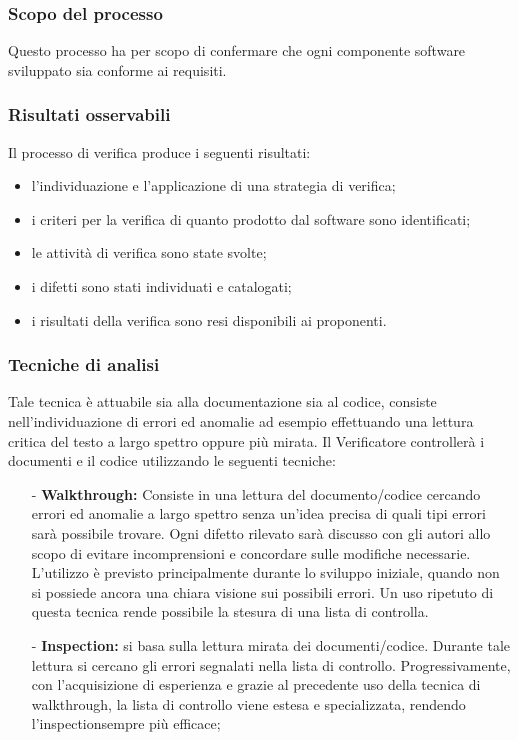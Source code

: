 \documentclass[a4paper,11pt]{article}
\begin{document}
				\subsubsection{Scopo del processo}
					Questo processo ha per scopo di confermare che ogni componente software sviluppato sia conforme ai requisiti.		
				\subsubsection{Risultati osservabili}
				Il processo di verifica produce i seguenti risultati:
				\begin{itemize}
					\item l'individuazione e l'applicazione di una strategia di verifica;
					\item i criteri per la verifica di quanto prodotto dal software sono identificati;
					\item le attività di verifica sono state svolte;
					\item i difetti sono stati individuati e catalogati;
					\item i risultati della verifica sono resi disponibili ai proponenti.
				\end{itemize}
				
				\subsubsection{Tecniche di analisi}
				Tale tecnica è attuabile sia alla documentazione sia al codice, consiste nell'individuazione di errori ed anomalie ad esempio effettuando una lettura critica del testo a largo spettro oppure più mirata. Il Verificatore controllerà i documenti e il codice utilizzando le seguenti tecniche:
				\begin{itemize}
				\item[-]\textbf{Walkthrough\addglos:} Consiste in una lettura del documento/codice cercando errori ed anomalie a largo spettro senza un’idea precisa di quali tipi errori sarà possibile trovare. Ogni difetto rilevato sarà discusso con gli autori allo scopo di evitare incomprensioni e concordare sulle modifiche necessarie. L'utilizzo è previsto principalmente durante lo sviluppo iniziale, quando non si possiede ancora una chiara visione sui possibili errori. Un uso ripetuto di questa tecnica rende possibile la stesura di una lista di controlla. 		
				
				\item[-]\textbf{Inspection\addglos:} si basa sulla lettura mirata dei documenti/codice. Durante tale lettura si cercano gli errori segnalati nella lista di controllo. Progressivamente, con l'acquisizione di esperienza e grazie al precedente uso della tecnica di walkthrough\addglos, la lista di controllo viene estesa e specializzata, rendendo l'inspection\addglos sempre più efficace;
				\end{itemize}
				
\end{document}
